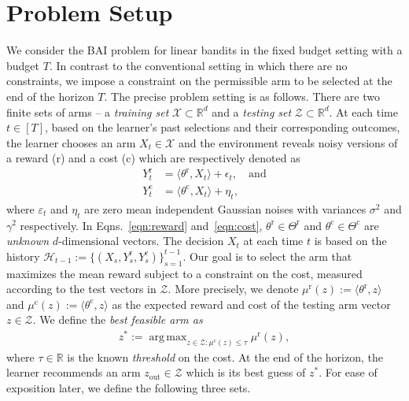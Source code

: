 \documentclass[accepted]{uai2025} %
\theoremstyle{plain}
\theoremstyle{definition}
\theoremstyle{remark}
\DeclareMathOperator*{\argmax}{arg\,max}
\begin{document}
\section{Problem Setup}
We consider the BAI  problem for linear bandits in the fixed budget setting with a budget $T$. In contrast to the conventional setting in which there are no constraints, we impose a constraint on the permissible arm to be selected at the end of the horizon $T$. The precise problem setting is as follows. There are two finite sets of arms -- a {\em training set} $\mathcal{X} \subset \mathbb{R}^d$ and a {\em testing set} $\mathcal{Z} \subset \mathbb{R}^d$. At each time $t \in [T]$, based on the learner's past selections and their corresponding outcomes, the learner chooses an arm $X_t \in \mathcal{X}$ and the environment reveals noisy versions of a reward (r) and a cost (c) which are respectively denoted as 
\begin{align}
    Y^{\mathrm{r}}_t &= \langle \theta^{\mathrm{r}}, X_t\rangle+\epsilon_t ,\quad \mbox{and} \label{eqn:reward}\\
    Y^{\mathrm{c}}_t &= \langle \theta^{\mathrm{c}}, X_t\rangle+\eta_t, \label{eqn:cost} 
\end{align}
where $\varepsilon_t$ and  $\eta_t$ are zero mean independent Gaussian noises with variances $\sigma^2$ and $\gamma^2$ respectively. In Eqns.~\eqref{eqn:reward} and~\eqref{eqn:cost}, $\theta^{\mathrm{r}} \in \Theta^{\mathrm{r}}$ and  $ \theta^{\mathrm{c}} \in \Theta^{\mathrm{c}}$ are {\em unknown} $d$-dimensional vectors. The decision $X_t $ at each time $t$ is based on the history $\mathcal{H}_{t-1} :=  \{  (X_s, Y_s^{\mathrm{r}}, Y_s^{\mathrm{c}} )\}_{s=1}^{t-1}$. Our goal is to select the arm that maximizes the mean reward subject to a constraint on the cost, measured according to the test vectors in $\mathcal{Z}$. More precisely, we denote $\mu^{\mathrm{r}}(z):=\langle \theta^{\mathrm{r}}, z \rangle$ and $\mu^{\mathrm{c}}(z):=\langle \theta^{\mathrm{c}}, z \rangle$ as the expected reward and cost of the testing arm vector $z\in \mathcal{Z}$. We define the {\em best feasible arm as}
\begin{align}
    z^*:= \argmax_{ z\in \mathcal{Z} :\mu^{\mathrm{c}}(z)\le\tau   }  \mu^{\mathrm{r}}(z), \nonumber
\end{align}
where $\tau\in\mathbb{R}$ is the known {\em threshold} on the cost.  At the end of the horizon, the learner recommends an arm $z_{\mathrm{out}} \in \mathcal{Z}$ which is its best guess of $z^*$. 
For ease of exposition later, we define the following three sets. 
\end{document}
